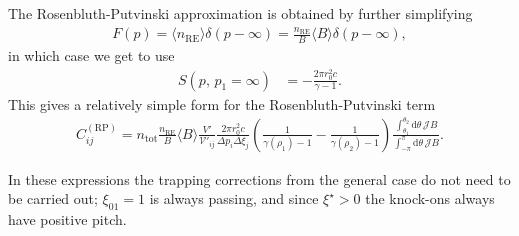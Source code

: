 \documentclass[11pt,a4paper]{article}
\newcommand{\rd}{\ensuremath{\mathrm{d}}}
\newcommand{\sub}[1]{\ensuremath{_{\text{#1}}}}
\begin{document}
The Rosenbluth-Putvinski approximation is obtained by further simplifying
\begin{align}
F(p) = \langle n\sub{RE} \rangle \delta(p-\infty) = \frac{n\sub{RE}}{B}\langle B \rangle \delta(p-\infty),
\end{align}
in which case we get to use
\begin{align}
S(p,\,p_1=\infty) &= -\frac{2\pi r_0^2 c}{\gamma-1}.
\end{align}
This gives a relatively simple form for the Rosenbluth-Putvinski term
\begin{align}
C_{ij}^\mathrm{(RP)} = n\sub{tot}\frac{n\sub{RE}}{B}\langle B \rangle \frac{V'}{\mathcal{V}'_{ij} }\frac{2\pi r_0^2 c}{\Delta p_i\Delta \xi_j}\left(\frac{1}{\gamma(\rho_1)-1} - \frac{1}{\gamma(\rho_2)-1}\right) \frac{\int_{\theta_1}^{\theta_2}\rd \theta \,\mathcal{J}B}{\int_{-\pi}^{\pi}\rd \theta \,\mathcal{J}B}.
\end{align}

In these expressions the trapping corrections from the general case do not need to be carried out; $\xi_{01}=1$ is always passing, and since $\xi^\star>0$ the knock-ons always have positive pitch.
\end{document}
